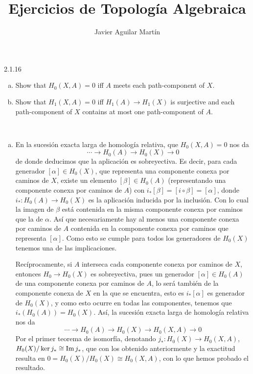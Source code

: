 \documentclass[twoside]{article}
\begin{document}
\title{Ejercicios de Topología Algebraica}
\author{Javier Aguilar Martín}
\maketitle

\begin{ejercicio}{2.1.16}\
\begin{enumerate}[(a)]
\item Show that $H_0(X,A) = 0$ iff $A$ meets each path-component of $X$.
\item Show that $H_1(X,A) = 0$ iff $H_1(A)→H_1(X)$ is surjective and each path-component
of $X$ contains at most one path-component of $A$.
\end{enumerate}
 

\end{ejercicio}
\begin{solucion}\
\begin{enumerate}[(a)]
\item En la sucesión exacta larga de homología relativa, que $H_0(X,A)=0$ nos da
\[
\cdots\to H_0(A)\to H_0(X)\to 0
\]
de donde deducimos que la aplicación es sobreyectiva. Es decir, para cada generador $[\alpha]\in H_0(X)$, que representa una componente conexa por caminos de $X$, existe un elemento $[\beta]\in H_0(A)$ (representando una componente conexa por caminos de $A$) con $i_*[\beta]=[i\circ \beta]=[\alpha]$, donde $i_*:H_0(A)\to H_0(X)$ es la aplicación inducida por la inclusión. Con lo cual la imagen de $\beta$ está contenida en la misma componente conexa por caminos que la de $\alpha$. Así que necesariamente hay al menos una componente conexa por caminos de $A$ contenida en la componente conexa por caminos que representa $[\alpha]$. Como esto se cumple para todos los generadores de $H_0(X)$ tenemos una de las implicaciones.

Recíprocamente, si $A$ interseca cada componente conexa por caminos de $X$, entonces $H_0\to H_0(X)$ es sobreyectiva, pues un generador $[\alpha]\in H_0(A)$ de una componente conexa por caminos de $A$, lo será también de la componente conexa de $X$ en la que se encuentra, esto es $i_*[\alpha]$ es generador de $H_0(X)$, y como esto ocurre en todas las componentes, tenemos que $i_*(H_0(A))=H_0(X)$. Así, la sucesión exacta larga de homología relativa nos da 
\[
\cdots\to H_0(A)\to H_0(X)\to H_0(X,A)\to 0
\]
Por el primer teorema de isomorfía, denotando $j_*:H_0(X)\to H_0(X,A)$,  $H_0(X)/\ker j_*\cong \operatorname{Im} j_*$, que con los obtenido anteriormente y la exactitud resulta en $0=H_0(X)/H_0(X)\cong H_0(X,A)$, con lo que hemos probado el resultado. 




\end{enumerate}
\end{solucion}
\end{document}
